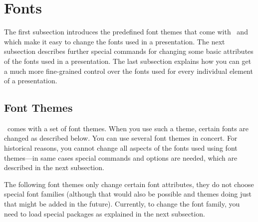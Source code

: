 %
%
%


\section{Fonts}

\label{section-fonts}

The first subsection introduces the predefined font
themes that come with \beamer\ and which make it easy to change the
fonts used in a presentation. The next subsection describes further
special commands for changing some basic attributes of the fonts used in a
presentation. The last subsection explains how you can get a much more
fine-grained control over the fonts used for every individual element
of a presentation.





\subsection{Font Themes}

\beamer\ comes with a set of font themes. When you use such a theme,
certain fonts are changed as described below. You can use several font
themes in concert. For historical reasons, you cannot change all
aspects of the fonts used using font themes---in same cases special
commands and options are needed, which are described in the next
subsection.

The following font themes only change certain font attributes, they do
not choose special font families (although that would also be possible
and themes doing just that might be added in the future). Currently,
to change the font family, you need to load special packages as
explained in the next subsection.


